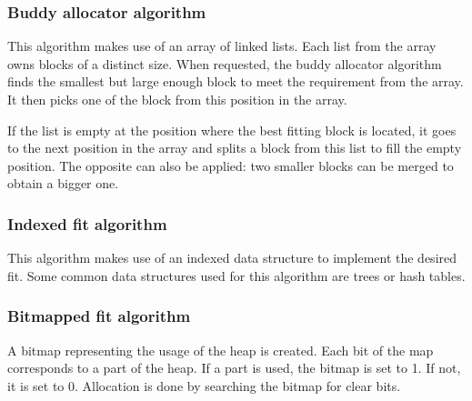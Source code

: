 \subsubsection{Buddy allocator algorithm}
This algorithm makes use of an array of linked lists.
Each list from the array owns blocks of a distinct size.
When requested, the buddy allocator algorithm finds the smallest but large enough block to meet the requirement from the array.
It then picks one of the block from this position in the array.

If the list is empty at the position where the best fitting block is located, it goes to the next position in the array
and splits a block from this list to fill the empty position.
The opposite can also be applied: two smaller blocks can be merged to obtain a bigger one.

\subsubsection{Indexed fit algorithm}
This algorithm makes use of an indexed data structure to implement the desired fit.
Some common data structures used for this algorithm are trees or hash tables.

\subsubsection{Bitmapped fit algorithm}
A bitmap representing the usage of the heap is created.
Each bit of the map corresponds to a part of the heap.
If a part is used, the bitmap is set to 1.
If not, it is set to 0.
Allocation is done by searching the bitmap for clear bits.



